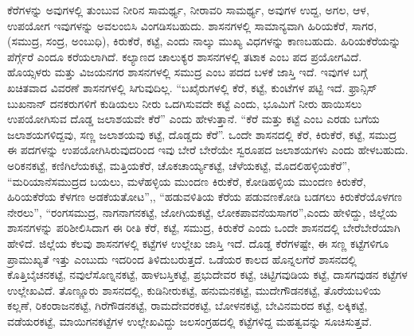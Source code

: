 ಕೆರೆಗಳನ್ನು ಅವುಗಳಲ್ಲಿ ತುಂಬುವ ನೀರಿನ ಸಾಮರ್ಥ್ಯ, ನೀರಾವರಿ ಸಾಮರ್ಥ್ಯ, ಅವುಗಳ ಉದ್ದ, ಅಗಲ, ಆಳ, ಉಪಯೋಗ ಇವುಗಳನ್ನು ಅವಲಂಬಿಸಿ ವಿಂಗಡಿಸಬಹುದು. ಶಾಸನಗಳಲ್ಲಿ ಸಾಮಾನ್ಯವಾಗಿ ಹಿರಿಯಕೆರೆ, ಸಾಗರ, (ಸಮುದ್ರ, ಸಂದ್ರ, ಅಂಬುಧಿ), ಕಿರುಕೆರೆ, ಕಟ್ಟೆ, ಎಂದು ನಾಲ್ಕು ಮುಖ್ಯ ವಿಧಗಳನ್ನು ಕಾಣಬಹುದು. ಹಿರಿಯಕೆರೆಯನ್ನು ಪೆರ್ಗ್ಗೆರೆ ಎಂದೂ ಕರೆಯಲಾಗಿದೆ. ಕಲ್ಯಾಣದ ಚಾಲುಕ್ಯರ ಶಾಸನಗಳಲ್ಲಿ ತಟಾಕ ಎಂಬ ಪದ ಪ್ರಯೋಗವಿದೆ. ಹೊಯ್ಸಳರು ಮತ್ತು ವಿಜಯನಗರ ಶಾಸನಗಳಲ್ಲಿ ಸಮುದ್ರ ಎಂಬ ಪದದ ಬಳಕೆ ಜಾಸ್ತಿ ಇದೆ. ಇವುಗಳ ಬಗ್ಗೆ ಖಚಿತವಾದ ವಿವರಣೆ ಶಾಸನಗಳಲ್ಲಿ ಸಿಗುವುದಿಲ್ಲ. “ಬಖೈರುಗಳಲ್ಲಿ ಕೆರೆ, ಕಟ್ಟೆ, ಕುಂಟೆಗಳ ಪಟ್ಟಿ ಇದೆ. ಫ್ರಾನ್ಸಿಸ್​ ಬುಖನಾನ್​ ದನಕರುಗಳಿಗೆ ಕುಡಿಯಲು ನೀರು ಒದಗಿಸುವದೇ ಕಟ್ಟೆ ಎಂದು, ಭೂಮಿಗೆ ನೀರು ಹಾಯಿಸಲು ಉಪಯೋಗಿಸುವ ದೊಡ್ಡ ಜಲಾಶಯವೇ ಕೆರೆ” ಎಂದು ಹೇಳುತ್ತಾನೆ. “ಕೆರೆ ಮತ್ತು ಕಟ್ಟೆ ಎಂಬ ಎರಡು ಬಗೆಯ ಜಲಾಶಯಗಳಿದ್ದವು, ಸಣ್ಣ ಜಲಾಶಯವು ಕಟ್ಟೆ, ದೊಡ್ಡದು ಕೆರೆ”. ಒಂದೇ ಶಾಸನದಲ್ಲಿ ಕೆರೆ, ಕಿರುಕೆರೆ, ಕಟ್ಟೆ, ಸಮುದ್ರ ಈ ಪದಗಳನ್ನು ಉಪಯೋಗಿಸಿರುವುದರಿಂದ ಇವು ಬೇರೆ ಬೇರೆಯೇ ಸ್ವರೂಪದ ಜಲಾಶಯಗಳು ಎಂದು ಹೇಳಬಹುದು. ಅರಿಕನಕಟ್ಟೆ, ಕಣಿಗಿಲೆಯಕಟ್ಟೆ, ಮತ್ತಿಯಕೆರೆ, ಚೊಕಚಾರ್ಯ್ಯಕಟ್ಟೆ, ಚೆಳೆಯಕಟ್ಟೆ, ಮೊದಲಿಹಳ್ಳಿಯಕೆರೆ”, “ಮರಿಯಾನೆಸಮುದ್ರದ ಬಯಲು, ಮಳೆಹಳ್ಳಿಯ ಮುಂದಣ ಕಿರುಕೆರೆ, ಕೋಡಿಹಳ್ಳಿಯ ಮುಂದಣ ಕಿರುಕೆರೆ, ಹಿರಿಯಕೆರೆಯ ಕೆಳಗಣ ಅಡಕೆಯತೋಟ”,, “ಹಡುವಳಿತಿಯ ಕೆರೆಯ ಪಡುವಣಕೋಡಿ ಬಡಗಲು ಕಿರುಕೆರೆಯೊಳಗಣ ನೇರಲು”, “ರಂಗಸಮುದ್ರ, ನಾಗನಾಗನಕಟ್ಟೆ, ಜೋಗಿಯಕಟ್ಟೆ, ಲೋಕಪಾವನೆಯಸಾಗರ”,ಎಂದು ಹೇಳಿದ್ದು, ಜಿಲ್ಲೆಯ ಶಾಸನಗಳನ್ನು ಪರಿಶೀಲಿಸಿದಾಗ ಈ ರೀತಿ ಕೆರೆ, ಕಟ್ಟೆ, ಸಮುದ್ರ, ಕಿರುಕೆರೆ ಎಂದು ಒಂದೇ ಶಾಸನದಲ್ಲಿ ಬೇರೆಬೇರೆಯಾಗಿ ಹೇಳಿದೆ. ಜಿಲ್ಲೆಯ ಕೆಲವು ಶಾಸನಗಳಲ್ಲಿ ಕಟ್ಟೆಗಳ ಉಲ್ಲೇಖ ಜಾಸ್ತಿ ಇದೆ. ದೊಡ್ಡ ಕೆರೆಗಳಷ್ಟೇ, ಈ ಸಣ್ಣ ಕಟ್ಟೆಗಳಿಗೂ ಪ್ರಾಮುಖ್ಯತೆ ಇತ್ತು ಎಂಬುದು ಇದರಿಂದ ತಿಳಿದುಬರುತ್ತದೆ. ಒಡೆಯರ ಕಾಲದ ಹೊನ್ನಲಗೆರೆ ಶಾಸನದಲ್ಲಿ ಕೊತ್ತಿಬೈಚನಕಟ್ಟೆ, ನವುಲೆಸೊಣ್ನನಕಟ್ಟೆ, ಹಾಳಬಸ್ತಿಕಟ್ಟೆ, ಪ್ರಭುದೇವರ ಕಟ್ಟೆ, ಚಿಟ್ಟಿಗವುಡಿಯ ಕಟ್ಟೆ, ದಾಸಗವುಡನ ಕಟ್ಟೆಗಳ ಉಲ್ಲೇಖವಿದೆ. ತೊಣ್ಣೂರು ಶಾಸನದಲ್ಲಿ, ಕುಡಿನೀರುಕಟ್ಟೆ, ಹನುಮನಕಟ್ಟೆ, ಮುದೇಗೌಡನಕಟ್ಟೆ, ತೊರೆಯಬಳಿಯ ಕಲ್ಲಣೆ, ರಿಕಂರಾಜನಕಟ್ಟೆ, ಗಿರೆಗೌಡನಕಟ್ಟೆ, ರಾಮದೇವರಕಟ್ಟೆ, ಬೋಳನಕಟ್ಟೆ, ಬೇವಿನಮರದ ಕಟ್ಟೆ, ಲಕ್ಕಿಕಟ್ಟೆ, ವಡೆಯರಕಟ್ಟೆ, ಮಾಯಿಗನಕಟ್ಟೆಗಳ ಉಲ್ಲೇಖವಿದ್ದು ಜಲಸಂಗ್ರಹದಲ್ಲಿ ಕಟ್ಟೆಗಳಿದ್ದ ಮಹತ್ವವನ್ನು ಸೂಚಿಸುತ್ತವೆ.

